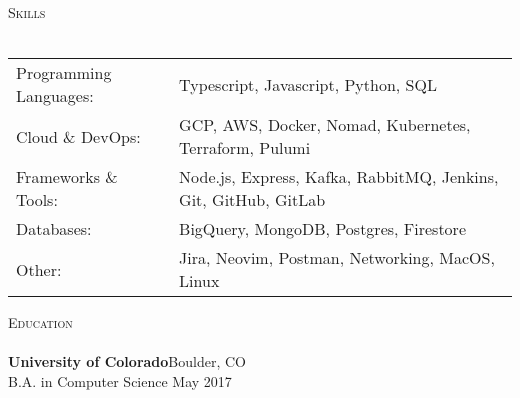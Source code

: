\documentclass[a4paper]{article}
\newcommand{\lineunder} {
    \vspace*{-8pt} \\
    \hspace*{-18pt} \hrulefill \\
}
\newcommand{\header} [1] {
    {\hspace*{-18pt}\vspace*{6pt} \textsc{#1}}
    \vspace*{-6pt} \lineunder
}
\begin{document}
\header{Skills}
\begin{tabular}{ l l }
	Programming Languages: & Typescript, Javascript, Python, SQL                             \\
  Cloud \& DevOps:       & GCP, AWS, Docker, Nomad, Kubernetes, Terraform, Pulumi          \\
  Frameworks \& Tools:   & Node.js, Express, Kafka, RabbitMQ, Jenkins, Git, GitHub, GitLab \\
	Databases:             & BigQuery, MongoDB, Postgres, Firestore                          \\
	Other:                 & Jira, Neovim, Postman, Networking, MacOS, Linux                 \\
\end{tabular}
\vspace{2mm}


%
%
%

\header{Education}
\textbf{University of Colorado}\hfill Boulder, CO\\
B.A. in Computer Science  \hfill May 2017\\
\vspace{2mm}


\end{document}

